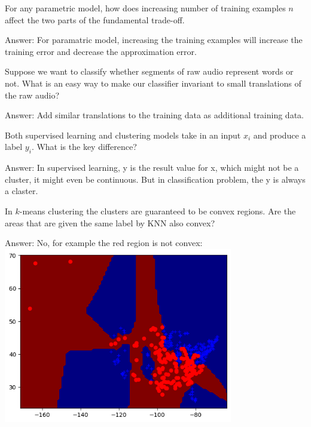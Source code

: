 \documentclass{article}
\def\ans#1{\par\gre{Answer: #1}}
\def\gre#1{{\color{gre}#1}}
\begin{document}
{\item For any parametric model, how does increasing number of training examples $n$ affect the two parts of the fundamental trade-off. \ans{For paramatric model, increasing the training examples will increase the training error and decrease the approximation error.}
\item Suppose we want to classify whether segments of raw audio represent words or not. What is an easy way to make our classifier invariant to small translations of the raw audio?  \ans{Add similar translations to the training data as additional training data.}
\item Both supervised learning and clustering models take in an input $x_i$ and produce a label $y_i$. What is the key difference? \ans{In supervised learning, y is the result value for x, which might not be a cluster, it might even be continuous. But in classification problem, the y is always a claster.}
\item In $k$-means clustering the clusters are guaranteed to be convex regions. Are the areas that are given the same label by KNN also convex? \ans {No, for example the red region is not convex: \\ \includegraphics[width=10cm]{Q3KnnPredictionGraph.png}}
}
\end{document}
